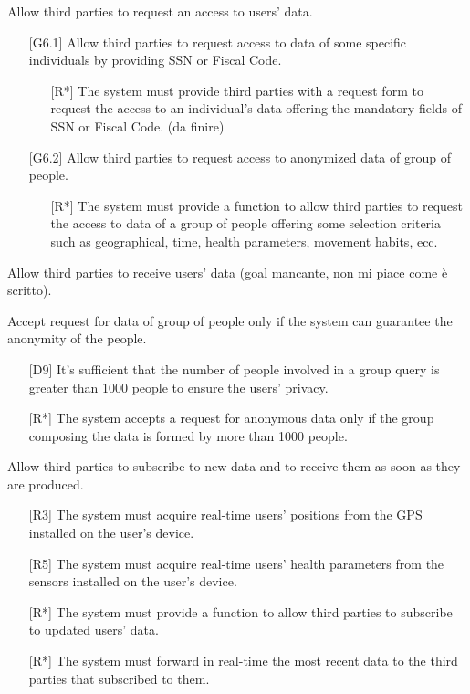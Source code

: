 \begin{enumerate} [label={[G\arabic*]}]
    \item Allow third parties to request an access to users' data.
    \begin{enumerate} [label*={.\arabic*}]
        \item [{[G6.1]}] Allow third parties to request access to data of some specific individuals by providing SSN or Fiscal Code.
            \begin{itemize}
                \item [{[R*]}] The system must provide third parties with a request form to request the access to an individual's data offering the mandatory fields of SSN or Fiscal Code. (da finire)
            \end{itemize}
        \item [{[G6.2]}] Allow third parties to request access to anonymized data of group of people.
            \begin{itemize}
                \item [{[R*]}] The system must provide a function to allow third parties to request the access to data of a group of people offering some selection criteria such as geographical, time, health parameters, movement habits, ecc.
            \end{itemize}
    \end{enumerate}
    
    \item Allow third parties to receive users' data (goal mancante, non mi piace come è scritto).
    
    \item Accept request for data of group of people only if the system can guarantee the anonymity of the people.
        \begin{itemize}
            \item [{[D9]}] It’s sufficient that the number of people involved in a group query is greater than 1000 people to ensure the users’ privacy.
            \item [{[R*]}] The system accepts a request for anonymous data only if the group composing the data is formed by more than 1000 people.
        \end{itemize}
        
    \item Allow third parties to subscribe to new data and to receive them as soon as they are produced.
        \begin{itemize}
            \item [{[R3]}] The system must acquire real-time users' positions from the GPS installed on the user's device.
            \item [{[R5]}] The system must acquire real-time users' health parameters from the sensors installed on the user's device.
            \item [{[R*]}] The system must provide a function to allow third parties to subscribe to updated users' data.
            \item [{[R*]}] The system must forward in real-time the most recent data to the third parties that subscribed to them.
        \end{itemize}
\end{enumerate}  
